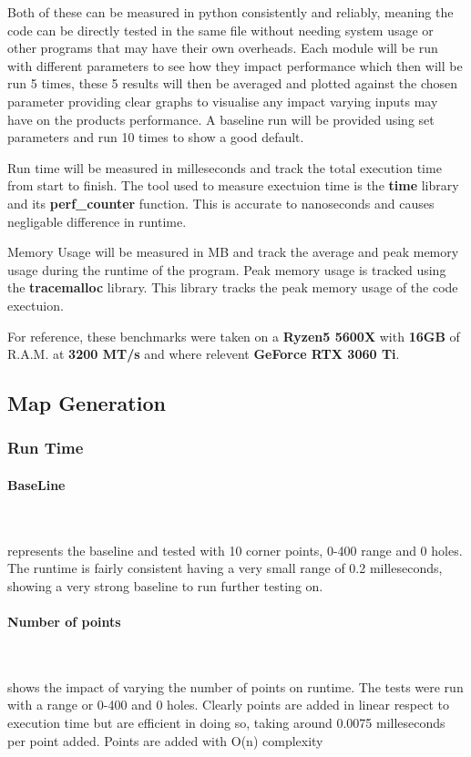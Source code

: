 \documentclass[final]{cmpreport_02}
\begin{document}
Both of these can be measured in python consistently and reliably, meaning the code can be directly tested in the same file without needing system usage or other programs that may have their own overheads.
Each module will be run with different parameters to see how they impact performance which then will be run 5 times,
these 5 results will then be averaged and plotted against the chosen parameter providing clear graphs to visualise any impact varying inputs may have on the products performance.
A baseline run will be provided using set parameters and run 10 times to show a good default.

Run time will be measured in milleseconds and track the total execution time from start to finish.
The tool used to measure exectuion time  is the \textbf{time} library and its \textbf{perf\_counter} function.
This is accurate to nanoseconds and causes negligable difference in runtime.

Memory Usage will be measured in MB and track the average and peak memory usage during the runtime of the program.
Peak memory usage is tracked using the \textbf{tracemalloc} library.
This library tracks the peak memory usage of the code exectuion.

For reference, these benchmarks were taken on a \textbf{Ryzen5 5600X} with \textbf{16GB} of R.A.M. at \textbf{3200 MT/s} and where relevent \textbf{GeForce RTX 3060 Ti}.

\subsection{Map Generation}
\subsubsection{Run Time}
\paragraph{BaseLine} \

 represents the baseline and tested with 10 corner points, 0-400 range and 0 holes.
The runtime is fairly consistent having a very small range of 0.2 milleseconds, showing a very strong baseline to run further testing on.


\paragraph{Number of points} \

 shows the impact of varying the number of points on runtime.
The tests were run with a range or 0-400 and 0 holes.
Clearly points are added in linear respect to execution time but are efficient in doing so, taking around 0.0075 milleseconds per point added.
Points are added with O(n) complexity
\end{document}

